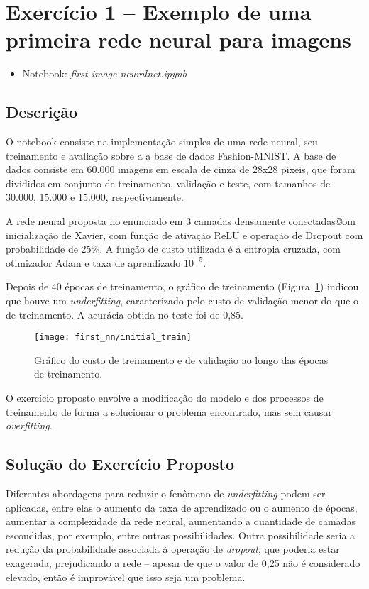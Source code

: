 \section{Exercício 1 -- Exemplo de uma primeira rede neural para imagens}

\begin{itemize}
	\item Notebook: \textit{first-image-neuralnet.ipynb}
\end{itemize}

\subsection{Descrição}

O notebook consiste na implementação simples de uma rede neural, seu treinamento e avaliação sobre a a base de dados Fashion-MNIST\cite{fmnist}. A base de dados consiste em 60.000 imagens em escala de cinza de 28x28 pixeis, que foram divididos em conjunto de treinamento, validação e teste, com tamanhos de 30.000, 15.000 e 15.000, respectivamente.

A rede neural proposta no enunciado em 3 camadas densamente conectadas©om inicialização de Xavier, com função de ativação ReLU e operação de Dropout com probabilidade de 25\%. A função de custo utilizada é a entropia cruzada, com otimizador Adam e taxa de aprendizado $10^{-5}$.

Depois de 40 épocas de treinamento, o gráfico de treinamento (Figura~\ref{fig:note1:init_train}) indicou que houve um \textit{underfitting}, caracterizado pelo custo de validação menor do que o de treinamento. A acurácia obtida no teste foi de 0,85.

\begin{figure}[!htb]
	\centering
	\texttt{[image: first\_nn/initial\_train]}
	\caption{Gráfico do custo de treinamento e de validação ao longo das épocas de treinamento.}
	\label{fig:note1:init_train}
\end{figure}

O exercício proposto envolve a modificação do modelo e dos processos de treinamento de forma a solucionar o problema encontrado, mas sem causar \textit{overfitting}.

\subsection{Solução do Exercício Proposto}

Diferentes abordagens para reduzir o fenômeno de \textit{underfitting} podem ser aplicadas, entre elas o aumento da taxa de aprendizado ou o aumento de épocas, aumentar a complexidade da rede neural, aumentando a quantidade de camadas escondidas, por exemplo, entre outras possibilidades. Outra possibilidade seria a redução da probabilidade associada à operação de \textit{dropout}, que poderia estar exagerada, prejudicando a rede -- apesar de que o valor de 0,25 não é considerado elevado, então é improvável que isso seja um problema.